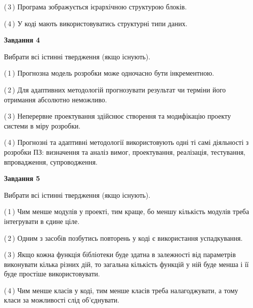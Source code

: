 \documentclass[10pt, ukrainian]{article}
\begin{document}
{\begin {large}
(\,3\,) Програма зображується ієрархічною структурою блоків.%



(\,4\,) У коді мають використовуватись структурні типи даних. %


{\begin {center}\textbf{Завдання 4}\end {center}}\par
Вибрати всі істинні твердження (якщо існують).\par
\vspace{2mm}



(\,1\,) Прогнозна модель розробки може одночасно бути інкрементною. %



(\,2\,) Для адаптивних методологій прогнозувати результат чи терміни його отримання абсолютно неможливо. %



(\,3\,) Неперервне проектування здійснює створення та модифікацію проекту системи в міру розробки. %



(\,4\,) Прогнозні та адаптивні методології використовують одні ті самі діяльності з розробки ПЗ: визначення та аналіз вимог, проектування, реалізація, тестування, впровадження, супроводження. %


{\begin {center}\textbf{Завдання 5}\end {center}}\par
Вибрати всі істинні твердження (якщо існують).\par
\vspace{2mm}



(\,1\,) Чим менше модулів у проекті, тим краще, бо меншу кількість модулів треба інтегрувати в єдине ціле. %



(\,2\,) Одним з засобів позбутись повторень у коді є використання успадкування. %



(\,3\,) Якщо кожна функція бібліотеки буде здатна в залежності від параметрів виконувати кілька різних дій, то загальна кількість функцій у ній буде менша і її буде простіше використовувати. %



(\,4\,) Чим менше класів у коді, тим менше класів треба налагоджувати, а тому класи за можливості слід об'єднувати. %


\end{large}}
\end{document}
